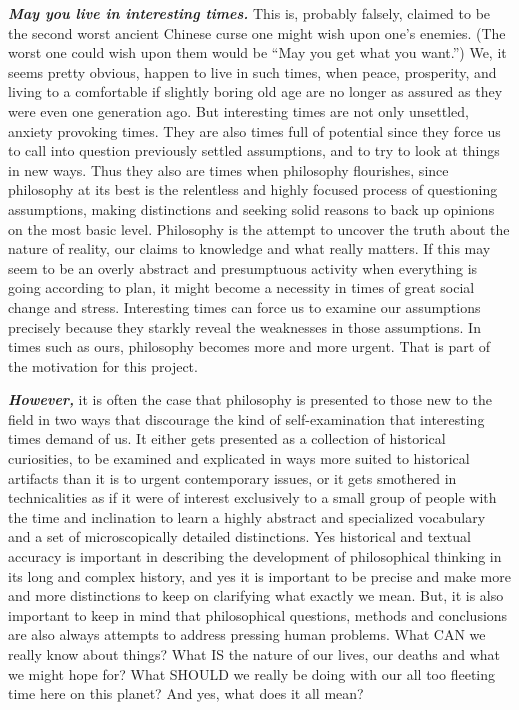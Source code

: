 \documentclass[
  12pt, openany]{book}
\begin{document}
\textbf{\emph{May you live in interesting times.}} This is, probably falsely, claimed to be the second worst ancient Chinese curse one might wish upon one's enemies. (The worst one could wish upon them would be ``May you get what you want.'') We, it seems pretty obvious, happen to live in such times, when peace, prosperity, and living to a comfortable if slightly boring old age are no longer as assured as they were even one generation ago. But interesting times are not only unsettled, anxiety provoking times. They are also times full of potential since they force us to call into question previously settled assumptions, and to try to look at things in new ways. Thus they also are times when philosophy flourishes, since philosophy at its best is the relentless and highly focused process of questioning assumptions, making distinctions and seeking solid reasons to back up opinions on the most basic level. Philosophy is the attempt to uncover the truth about the nature of reality, our claims to knowledge and what really matters. If this may seem to be an overly abstract and presumptuous activity when everything is going according to plan, it might become a necessity in times of great social change and stress. Interesting times can force us to examine our assumptions precisely because they starkly reveal the weaknesses in those assumptions. In times such as ours, philosophy becomes more and more urgent. That is part of the motivation for this project.

\textbf{\emph{However,}} it is often the case that philosophy is presented to those new to the field in two ways that discourage the kind of self-examination that interesting times demand of us. It either gets presented as a collection of historical curiosities, to be examined and explicated in ways more suited to historical artifacts than it is to urgent contemporary issues, or it gets smothered in technicalities as if it were of interest exclusively to a small group of people with the time and inclination to learn a highly abstract and specialized vocabulary and a set of microscopically detailed distinctions. Yes historical and textual accuracy is important in describing the development of philosophical thinking in its long and complex history, and yes it is important to be precise and make more and more distinctions to keep on clarifying what exactly we mean. But, it is also important to keep in mind that philosophical questions, methods and conclusions are also always attempts to address pressing human problems. What CAN we really know about things? What IS the nature of our lives, our deaths and what we might hope for? What SHOULD we really be doing with our all too fleeting time here on this planet? And yes, what does it all mean?
\end{document}
